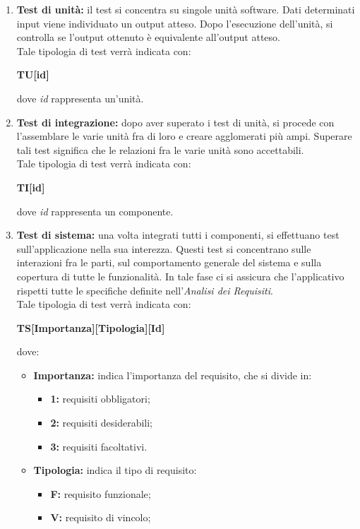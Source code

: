 \begin{enumerate}
	\item \textbf{Test di unità:} il test si concentra su singole unità software. Dati determinati input viene individuato un output atteso. Dopo l'esecuzione dell'unità, si controlla se l'output ottenuto è equivalente all'output atteso.\\
Tale tipologia di test verrà indicata con:
\begin{center}
	\textbf{TU[id]}
\end{center}
dove \textit{id} rappresenta un’unità.
	\item \textbf{Test di integrazione:} dopo aver superato i test di unità, si procede con l'assemblare le varie unità fra di loro e creare agglomerati più ampi. Superare tali test significa che le relazioni fra le varie unità sono accettabili.\\
Tale tipologia di test verrà indicata con:
\begin{center}
	\textbf{TI[id]}
\end{center}
dove \textit{id} rappresenta un componente.
	\item \textbf{Test di sistema:} una volta integrati tutti i componenti, si effettuano test sull'applicazione nella sua interezza. Questi test si concentrano sulle interazioni fra le parti, sul comportamento generale del sistema e sulla copertura di tutte le funzionalità. In tale fase ci si assicura che l'applicativo rispetti tutte le specifiche definite nell'\textit{Analisi dei Requisiti}.\\
Tale tipologia di test verrà indicata con:
\begin{center}
	\textbf{TS[Importanza][Tipologia][Id]}
\end{center}
dove:
\begin{itemize}
	\item \textbf{Importanza:} indica l'importanza del requisito, che si divide in:
	\begin{itemize}
		\item \textbf{1:} requisiti obbligatori;
		\item \textbf{2:} requisiti desiderabili;
		\item \textbf{3:} requisiti facoltativi.
	\end{itemize}
	\item \textbf{Tipologia:} indica il tipo di requisito:
	\begin{itemize}
		\item \textbf{F:} requisito funzionale;
		\item \textbf{V:} requisito di vincolo;

\end{itemize}
\end{itemize}
\end{enumerate}
